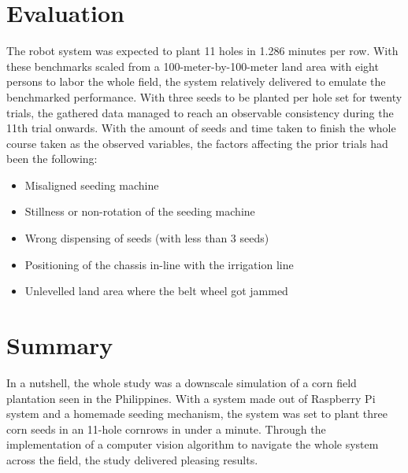 \section{Evaluation}
The robot system was expected to plant 11 holes in 1.286 minutes per row. With these benchmarks scaled from a 100-meter-by-100-meter land area with eight persons to labor the whole field, the system relatively delivered to emulate the benchmarked performance. With three seeds to be planted per hole set for twenty trials, the gathered data managed to reach an observable consistency during the 11th trial onwards. With the amount of seeds and time taken to finish the whole course taken as the observed variables, the factors affecting the prior trials had been the following:
\begin{itemize}
\item {Misaligned seeding machine}
\item {Stillness or non-rotation of the seeding machine}
\item {Wrong dispensing of seeds (with less than 3 seeds)}
\item {Positioning of the chassis in-line with the irrigation line}
\item {Unlevelled land area where the belt wheel got jammed}
\end{itemize}
\section{Summary}
	In a nutshell, the whole study was a downscale simulation of a corn field plantation seen in the Philippines. With a system made out of Raspberry Pi system and a homemade seeding mechanism, the system was set to plant three corn seeds in an 11-hole cornrows in under a minute. Through the implementation of a computer vision algorithm to navigate the whole system across the field, the study delivered pleasing results.
